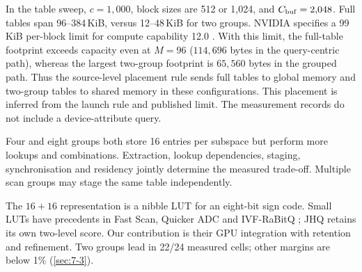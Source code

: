 In the table sweep, $c=1{,}000$, block sizes are 512 or 1,024, and
$C_{\rm buf}=2{,}048$. Full tables span 96--384\,KiB, versus
12--48\,KiB for two groups. NVIDIA specifies a 99\,KiB per-block limit
for compute capability 12.0 \cite{blackwell_tuning}. With this limit,
the full-table footprint exceeds capacity even at $M=96$
($114{,}696$ bytes in the query-centric path), whereas the largest
two-group footprint is $65{,}560$ bytes in the grouped path.
Thus the source-level placement rule sends full tables to global memory
and two-group tables to shared memory in these configurations. This placement is inferred from the launch rule and published limit.
The measurement records do not include a device-attribute query.

Four and eight groups both store 16 entries per subspace but perform
more lookups and combinations. Extraction, lookup dependencies, staging,
synchronisation and residency jointly determine the measured trade-off.
Multiple scan groups may stage the same table independently.

The $16+16$ representation is a nibble LUT for an eight-bit sign code.
Small LUTs have precedents in Fast Scan, Quicker ADC and IVF-RaBitQ \cite{fastscan,quickeradc,ivfrabitq}; JHQ retains its own two-level score. Our contribution is their GPU integration with retention and refinement. Two groups lead in 22/24 measured cells; other margins are below 1\% (\cref{sec:7-3}).